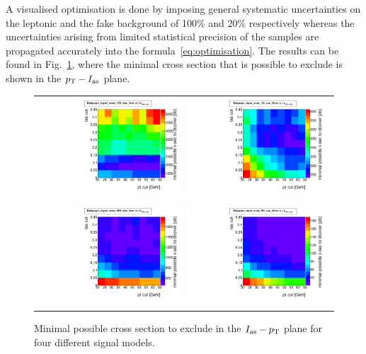 A visualised optimisation is done by imposing general systematic uncertainties on the leptonic and the fake background of 100\% and 20\% respectively whereas
the uncertainties arising from limited statistical precision of the samples are propagated accurately into the formula~\ref{eq:optimisation}.
The results can be found in Fig.~\ref{fig:optimisation}, where the minimal cross section that is possible to exclude is shown in the $p_{\text{T}}-I_{\text{as}}$ plane.
\begin{figure}[!h]
  \centering 
  \begin{tabular}{c}
    \includegraphics[width=0.49\textwidth]{figures/analysis/Optimisation/Madgraph_signal_mass_100_ctau_5cm_ECaloLe5_SOverDeltaBStatPlusSys.pdf} 
    \includegraphics[width=0.49\textwidth]{figures/analysis/Optimisation/Madgraph_signal_mass_100_ctau_50cm_ECaloLe5_SOverDeltaBStatPlusSys.pdf}\\ 
    \includegraphics[width=0.49\textwidth]{figures/analysis/Optimisation/Madgraph_signal_mass_500_ctau_5cm_ECaloLe5_SOverDeltaBStatPlusSys.pdf}
    \includegraphics[width=0.49\textwidth]{figures/analysis/Optimisation/Madgraph_signal_mass_500_ctau_50cm_ECaloLe5_SOverDeltaBStatPlusSys.pdf} 
  \end{tabular}
  \caption{Minimal possible cross section to exclude in the $I_{\text{as}}-p_{\text{T}}$ plane for four different signal models.}
  \label{fig:optimisation}
\end{figure} 
